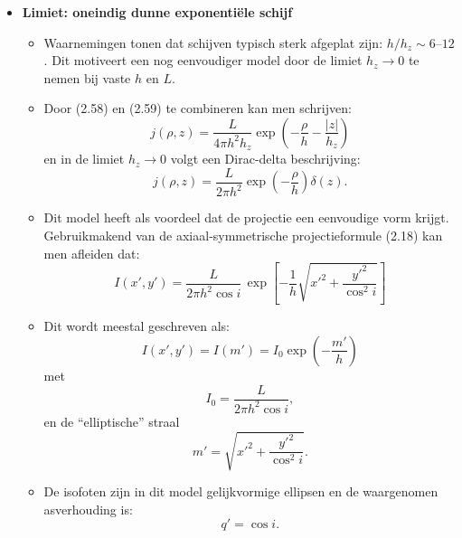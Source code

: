 \documentclass[10pt,a4paper]{article}
\renewenvironment{equation}{\begin{equation*}}{\end{equation*}}
\begin{document}
\begin{itemize}
  \item \textbf{Limiet: oneindig dunne exponentiële schijf}
  \begin{itemize}
    \item Waarnemingen tonen dat schijven typisch sterk afgeplat zijn: $h/h_z \sim 6$--$12$. Dit motiveert een nog eenvoudiger model door de limiet $h_z\to 0$ te nemen bij vaste $h$ en $L$.
    \item Door (2.58) en (2.59) te combineren kan men schrijven:
    \begin{equation}
      j(\rho,z)=\frac{L}{4\pi h^2 h_z}\exp\!\left(-\frac{\rho}{h}-\frac{|z|}{h_z}\right)
      \tag{2.62}
    \end{equation}
    en in de limiet $h_z\to 0$ volgt een Dirac-delta beschrijving:
    \[
      j(\rho,z)=\frac{L}{2\pi h^2}\exp\!\left(-\frac{\rho}{h}\right)\delta(z).
    \]
    \item Dit model heeft als voordeel dat de projectie een eenvoudige vorm krijgt. Gebruikmakend van de axiaal-symmetrische projectieformule (2.18) kan men afleiden dat:
    \begin{equation}
      I(x',y') = \frac{L}{2\pi h^2 \cos i}\,
      \exp\!\left[-\frac{1}{h}\sqrt{x'^2+\frac{y'^2}{\cos^2 i}}\right]
      \tag{2.64}
    \end{equation}
    \item Dit wordt meestal geschreven als:
    \begin{equation}
      I(x',y')=I(m')=I_0\exp\!\left(-\frac{m'}{h}\right)
      \tag{2.65}
    \end{equation}
    met
    \begin{equation}
      I_0=\frac{L}{2\pi h^2\cos i},
      \tag{2.66}
    \end{equation}
    en de ``elliptische'' straal
    \begin{equation}
      m'=\sqrt{x'^2+\frac{y'^2}{\cos^2 i}}.
      \tag{2.67}
    \end{equation}
    \item De isofoten zijn in dit model gelijkvormige ellipsen en de waargenomen asverhouding is:
    \[
      q'=\cos i.
    \]
  \end{itemize}


\end{itemize}
\end{document}
